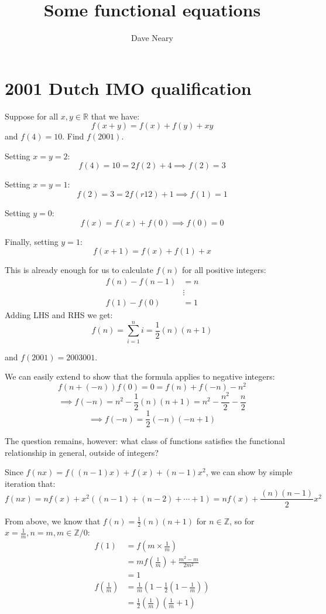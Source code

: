 \documentclass{article}
\begin{document}
\title{Some functional equations}
\author{Dave Neary}

\maketitle

\section{2001 Dutch IMO qualification}

Suppose for all $x,y \in \mathbb{R}$ that we have:
\[ f(x + y) = f(x) + f(y) + xy \]
and $f(4) = 10$. Find $f(2001)$.

Setting $x=y=2$:
\[ f(4) = 10 = 2f(2) + 4 \implies f(2) = 3\]

Setting $x=y=1$:
\[ f(2) = 3 = 2f(r12) + 1 \implies f(1) = 1\]

Setting $y=0$:
\[ f(x) = f(x) + f(0) \implies f(0) = 0 \]

Finally, setting $y=1$:
\[ f(x+1) = f(x) + f(1) + x \]

This is already enough for us to calculate $f(n)$ for all positive integers:
\begin{align}
	f(n) - f(n-1) & = n \\
	& \vdots \\
	f(1)-f(0) &= 1
\end{align}
Adding LHS and RHS we get:
\[ f(n) = \sum_{i=1}^{n} i = \frac{1}{2}(n)(n+1) \]

and $f(2001) = 2003001$.

We can easily extend to show that the formula applies to negative integers:
\[f(n + (-n)) f(0) = 0 = f(n) + f(-n) - n^2 \]
\[ \implies f(-n) = n^2 - \frac{1}{2}(n)(n+1) = n^2 - \frac{n^2}{2} - \frac{n}{2} \]
\[ \implies f(-n) = \frac{1}{2}(-n)(-n+1) \]


The question remains, however: what class of functions satisfies the functional relationship in
general, outside of integers?

Since $f(nx) = f((n-1)x) + f(x) + (n-1)x^2$, we can show by simple iteration that:
\[ f(nx) = nf(x) + x^2((n-1)+(n-2)+\cdots + 1) = nf(x) + \frac{(n)(n-1)}{2} x^2 \]

From above, we know that $f(n) = \frac{1}{2}(n)(n+1)$ for $n\in \mathbb{Z}$, so
for $x=\frac{1}{m}, n=m, m \in \mathbb{Z}/{0}$:
\begin{align}
	f(1) &= f(m\times\frac{1}{m}) \\
	     &= mf(\frac{1}{m}) + \frac{m^2-m}{2m^2} \\
	     &= 1 \\
	f(\frac{1}{m}) &= \frac{1}{m}(1- \frac{1}{2}(1-\frac{1}{m})) \\
	               &= \frac{1}{2}(\frac{1}{m})(\frac{1}{m} + 1)
\end{align}
\end{document}
